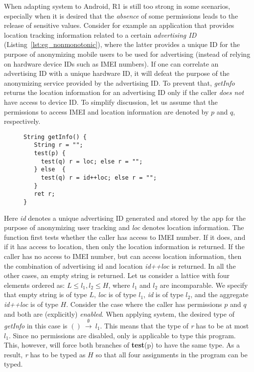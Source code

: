 When adapting {\BN} system to Android, R1
is still too strong in some scenarios, especially when it is desired that the \emph{absence} of some permissions
leads to the release of sensitive values. Consider for example an application
that provides location tracking information related to a certain
{\em advertising ID} (Listing~\ref{lst:eg_nonmonotonic}), where the latter provides a unique ID for the purpose of anonymizing mobile users
to be used for advertising (instead of relying on hardware device IDs such
as IMEI numbers). If one can correlate an advertising
ID with a unique hardware ID, it will defeat the purpose of
the anonymizing service provided by the advertising ID. To prevent
that, \textit{getInfo} returns the location information for an advertising ID
only if the caller \emph{does not} have access to device ID.
To simplify discussion, let us assume that the permissions to access
IMEI and location information are denoted by $p$ and $q$, respectively.
\begin{figure}[ht]
\begin{lstlisting}[caption={An example about non-monotonic policy.}, label={lst:eg_nonmonotonic}]
String getInfo() {
   String r = "";
   test(p) {
     test(q) r = loc; else r = "";
   } else  {
     test(q) r = id++loc; else r = "";
   }
   ret r;
}
\end{lstlisting}
\end{figure}
Here \textit{id} denotes a unique advertising ID  generated and stored by the app for
the purpose of anonymizing user tracking and \textit{loc} denotes location
information.
The function first tests whether the caller has access to IMEI number.
If it does, and if it has access to location, then only the location information is returned.
If the caller has no access to IMEI number, but can access location information,
then the combination of advertising id and location \textit{id++loc} is returned.
In all the other cases, an empty string is returned.
Let us consider a lattice with four elements ordered as:
$L \leq l_1, l_2 \leq H$, where $l_1$ and $l_2$ are incomparable. We specify that empty string is of type $L$, \textit{loc} is of type $l_1$,
\textit{id} is of type $l_2$, and the aggregate \textit{id++loc} is of type $H.$
Consider the case where the caller has permissions $p$ and $q$ and both are (explicitly) \emph{enabled}.
When applying {\BN} system, the desired type of \textit{getInfo} in this case is  $()~{\xrightarrow{~\emptyset~}}~l_1$.
This means that the type of \textit{r} has to be at most $l_1$.
Since no permissions are disabled, only  is applicable
to type this program. This, however, will force both branches of \textbf{test}(p)
to have the same type. As a result, \textit{r}
has to be typed as $H$ so that all four assignments in the program
can be typed.


